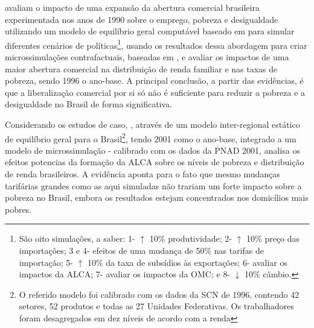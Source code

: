 \textcite{carneiro06} avaliam o impacto de uma expansão da abertura comercial brasileira experimentada nos anos de 1990 sobre o emprego, pobreza e desigualdade utilizando um modelo de equilíbrio geral computável baseado em \textcite{robinson99} para simular diferentes cenários de políticas\footnote{São oito simulações, a saber: 1- $\uparrow$ 10\% produtividade; 2- $\uparrow$ 10\% preço das importações; 3 e 4- efeitos de uma mudança de 50\% nas tarifas de importação; 5- $\uparrow$ 10\% da taxa de subsídios às exportações; 6- avaliar os impactos da ALCA; 7- avaliar os impactos da OMC; e 8- $\downarrow$ 10\% câmbio.}, usando os resultados dessa abordagem para criar microssimulações contrafactuais, baseadas em \textcite{ganuza07}, e avaliar os impactos de uma maior abertura comercial na distribuição de renda familiar e nas taxas de pobreza, sendo 1996 o ano-base. A principal conclusão, a partir das evidências, é que a liberalização comercial por si só não é suficiente para reduzir a pobreza e a desigualdade no Brasil de forma significativa.

Considerando os estudos de caso, \textcite{ferreira06}, através de um modelo inter-regional estático de equilíbrio geral para o Brasil\footnote{O referido modelo foi calibrado com os dados da SCN de 1996, contendo 42 setores, 52 produtos e todas as 27 Unidades Federativas. Os trabalhadores foram desagregados em dez níveis de acordo com a renda}, tendo 2001 como o ano-base, integrado a um modelo de microssimulação - calibrado com os dados da PNAD 2001, analisa os efeitos potencias da formação da ALCA sobre os níveis de pobreza e distribuição de renda brasileiros. A evidência aponta para o fato que mesmo mudanças tarifárias grandes como as aqui simuladas não trariam um forte impacto sobre
a pobreza no Brasil, embora os resultados estejam concentrados nos domicílios mais pobres.

